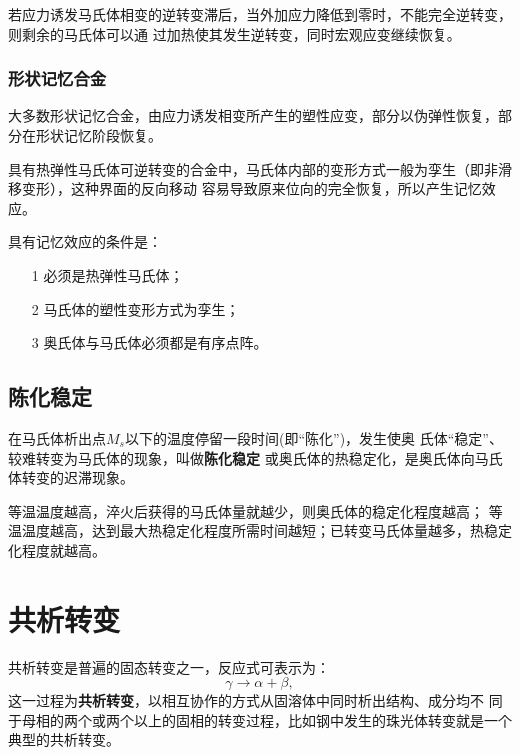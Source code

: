                 若应力诱发马氏体相变的逆转变滞后，当外加应力降低到零时，不能完全逆转变，则剩余的马氏体可以通
                过加热使其发生逆转变，同时宏观应变继续恢复。
            \subsubsection{形状记忆合金}
                大多数形状记忆合金，由应力诱发相变所产生的塑性应变，部分以伪弹性恢复，部分在形状记忆阶段恢复。

                具有热弹性马氏体可逆转变的合金中，马氏体内部的变形方式一般为孪生（即非滑移变形），这种界面的反向移动
                容易导致原来位向的完全恢复，所以产生记忆效应。

                具有记忆效应的条件是：
                \begin{itemize}
                    \item[1] 必须是热弹性马氏体；
                    \item[2] 马氏体的塑性变形方式为孪生；
                    \item[3] 奥氏体与马氏体必须都是有序点阵。
                \end{itemize}
        \subsection{陈化稳定}
            在马氏体析出点$M_s$以下的温度停留一段时间(即“陈化”)，发生使奥
            氏体“稳定”、较难转变为马氏体的现象，叫做\textbf{陈化稳定}
            或奥氏体的热稳定化，是奥氏体向马氏体转变的迟滞现象。

            等温温度越高，淬火后获得的马氏体量就越少，则奥氏体的稳定化程度越高；
            等温温度越高，达到最大热稳定化程度所需时间越短；已转变马氏体量越多，热稳定
            化程度就越高。
    \section{共析转变}
        共析转变是普遍的固态转变之一，反应式可表示为：
        \begin{equation}
            \gamma\to\alpha+\beta,
        \end{equation}
        这一过程为\textbf{共析转变}，以相互协作的方式从固溶体中同时析出结构、成分均不
        同于母相的两个或两个以上的固相的转变过程，比如钢中发生的珠光体转变就是一个典型的共析转变。

